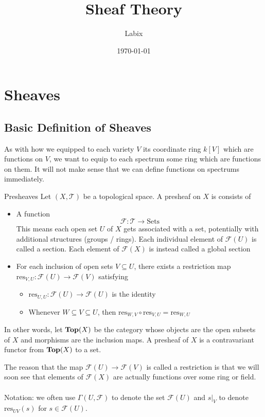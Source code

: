 \documentclass[a4paper]{article}
\title{Sheaf Theory}
\author{Labix}
\date{\today}
\begin{document}
\maketitle
\begin{abstract}
\end{abstract}
\pagebreak
\tableofcontents
\pagebreak

\section{Sheaves}
\subsection{Basic Definition of Sheaves}
As with how we equipped to each variety $V$ its coordinate ring $k[V]$ which are functions on $V$, we want to equip to each spectrum some ring which are functions on them. It will not make sense that we can define functions on spectrums immediately. 

\begin{defn}{Presheaves}{} Let $(X,\mathcal{T})$ be a topological space. A presheaf on $X$ is consists of
\begin{itemize}
\item A function $$\mathcal{F}:\mathcal{T}\to\text{Sets}$$ This means each open set $U$ of $X$ gets associated with a set, potentially with additional structures (groups / rings). Each individual element of $\mathcal{F}(U)$ is called a section. Each element of $\mathcal{F}(X)$ is instead called a global section
\item For each inclusion of open sets $V\subseteq U$, there exists a restriction map $\text{res}_{V,U}:\mathcal{F}(U)\to\mathcal{F}(V)$
 satisfying
\begin{itemize}
\item $\text{res}_{U,U}:\mathcal{F}(U)\to\mathcal{F}(U)$ is the identity
\item Whenever $W\subseteq V\subseteq U$, then $\text{res}_{W,V}\circ\text{res}_{V,U}=\text{res}_{W,U}$
\end{itemize}
\end{itemize}
In other words, let $\bold{Top}(X)$ be the category whose objects are the open subsets of $X$ and morphisms are the inclusion maps. A presheaf of $X$ is a contravariant functor from $\bold{Top}(X)$ to a set.
\end{defn}

The reason that the map $\mathcal{F}(U)\to\mathcal{F}(V)$ is called a restriction is that we will soon see that elements of $\mathcal{F}(X)$ are actually functions over some ring or field. \\~\\
Notation: we often use $\Gamma(U,\mathcal{F})$ to denote the set $\mathcal{F}(U)$ and $s|_V$ to denote $\text{res}_{UV}(s)$ for $s\in\mathcal{F}(U)$. 
\end{document}
